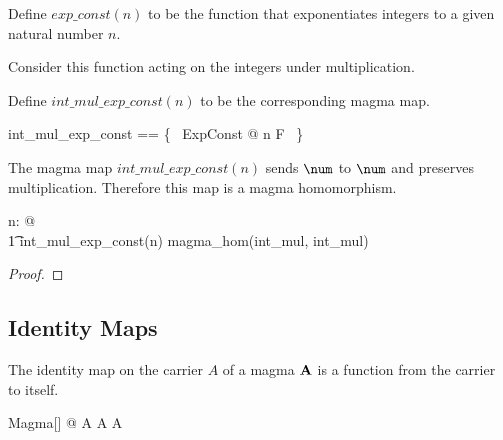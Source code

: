 \documentclass{amsart}
\begin{document}
\begin{example}

Define $exp\_const(n)$ to be the function that exponentiates integers to
a given natural number $n$.


Consider this function acting on the integers under multiplication.


Define $int\_mul\_exp\_const(n)$ to be the corresponding magma map.

\begin{zed}
	int\_mul\_exp\_const == \{~ ExpConst @ n \mapsto F ~\}
\end{zed}

The magma map $int\_mul\_exp\_const(n)$ sends $\num$ to $\num$ and preserves multiplication.
Therefore this map is a magma homomorphism.

\begin{zed}
	\forall n: \nat @ \\
	\t1	int\_mul\_exp\_const(n) \in magma\_hom(int\_mul, int\_mul)
\end{zed}

\begin{proof}
\end{proof}

\end{example}

\subsection{Identity Maps}

\begin{remark}
The identity map on the carrier $A$ of a magma $\mathbf{A}$ is a function from the carrier to itself.

\begin{zed}
	\forall Magma[\setT] @ \id A \in A \fun A
\end{zed}

\end{remark}
\end{document}
